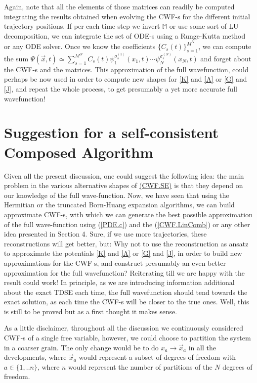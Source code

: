 \documentclass[11pt, a4paper]{article} %
\begin{document}
Again, note that all the elements of those matrices can readily be computed integrating the results obtained when evolving the CWF-s for the different initial trajectory positions. If per each time step we invert $\mathbb{M}$ or use some sort of LU decomposition, we can integrate the set of ODE-s using a Runge-Kutta method or any ODE solver. Once we know the coefficients $\{C_s(t)\}_{s=1}^{M^N}$, we can compute the sum $\Psi(\vec{x},t)\simeq \sum_{s=1}^{M^N} C_s(t) \psi_1^{\sigma^{(1)}_s}(x_1,t)\cdots \psi_N^{\sigma^{(N)}_s}(x_N,t)$ and forget about the CWF-s and the matrices. This approximation of the full wavefunction, could perhaps be now used in order to compute new shapes for \ref{K} and \ref{A} or \ref{G} and \ref{J}, and repeat the whole process, to get presumably a yet more accurate full wavefunction!

\section{Suggestion for a self-consistent Composed Algorithm}
Given all the present discussion, one could suggest the following idea: the main problem in the various alternative shapes of \hyperref[CWF.SE]{(CWF.SE)} is that they depend on our knowledge of the full wave-function. Now, we have seen that using the Hermitian or the truncated Born-Huang expansion algorithms, we can build approximate CWF-s, with which we can generate the best possible approximation of the full wave-function using (\ref{PDE.c}) and the (\ref{CWF.LinComb}) or any other idea presented in Section 4. Sure, if we use more trajectories, these reconstructions will get better, but: Why not to use the reconstruction as ansatz to approximate the potentials \ref{K} and \ref{A} or \ref{G} and \ref{J}, in order to build new approximations for the CWF-s, and construct presumably an even better approximation for the full wavefunction? Reiterating till we are happy with the result could work! In principle, as we are introducing information additional about the exact TDSE each time, the full wavefunction should tend towards the exact solution, as each time the CWF-s will be closer to the true ones. Well, this is still to be proved but as a first thought it makes sense. 

As a little disclaimer, throughout all the discussion we continuously considered CWF-s of a single free variable, however, we could choose to partition the system in a coarser grain. The only change would be to do $x_a\longrightarrow \vec{x}_a$ in all the developments, where $\vec{x}_a$ would represent a subset of degrees of freedom with $a\in \{1,..n\}$, where $n$ would represent the number of partitions of the $N$ degrees of freedom.\vspace{-0.2cm}
\end{document}
